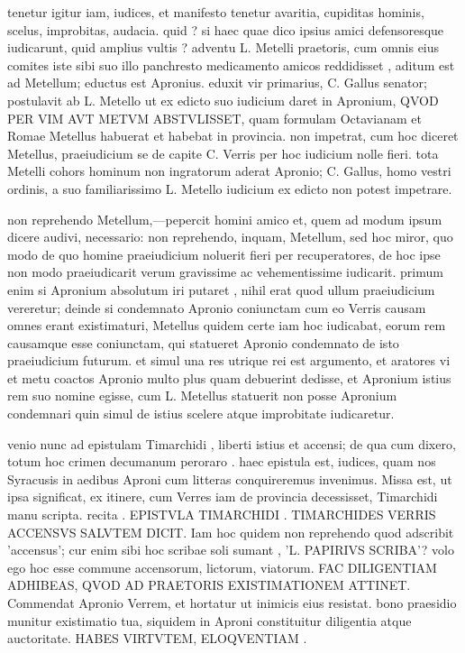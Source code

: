  tenetur igitur iam, iudices, et manifesto tenetur avaritia, cupiditas hominis, scelus, improbitas, audacia. quid ? si haec quae dico ipsius amici defensoresque iudicarunt, quid amplius vultis ? adventu L. Metelli praetoris, cum omnis eius comites iste sibi suo illo panchresto medicamento amicos reddidisset , aditum est ad Metellum; eductus est Apronius. eduxit vir primarius, C. Gallus senator; postulavit ab L. Metello ut ex edicto suo iudicium daret in Apronium, QVOD PER VIM AVT METVM ABSTVLISSET, quam formulam Octavianam et Romae Metellus habuerat et habebat in provincia. non impetrat, cum hoc diceret Metellus, praeiudicium se de capite C. Verris per hoc iudicium nolle fieri. tota Metelli cohors hominum non ingratorum aderat Apronio; C. Gallus, homo vestri ordinis, a suo familiarissimo L. Metello iudicium ex edicto non potest impetrare.

 non reprehendo Metellum,—pepercit homini amico et, quem ad modum ipsum dicere audivi, necessario: non reprehendo, inquam, Metellum, sed hoc miror, quo modo de quo homine praeiudicium noluerit fieri per recuperatores, de hoc ipse non modo praeiudicarit verum gravissime ac vehementissime iudicarit. primum enim si Apronium absolutum iri putaret , nihil erat quod ullum praeiudicium vereretur; deinde si condemnato Apronio coniunctam cum eo Verris causam omnes erant existimaturi, Metellus quidem certe iam hoc iudicabat, eorum rem causamque esse coniunctam, qui statueret Apronio condemnato de isto praeiudicium futurum. et simul una res utrique rei est argumento, et aratores vi et metu coactos Apronio multo plus quam debuerint dedisse, et Apronium istius rem suo nomine egisse, cum L. Metellus statuerit non posse Apronium condemnari quin simul de istius scelere atque improbitate iudicaretur.

 venio nunc ad epistulam Timarchidi , liberti istius et accensi; de qua cum dixero, totum hoc crimen decumanum peroraro . haec epistula est, iudices, quam nos Syracusis in aedibus Aproni cum litteras conquireremus invenimus. Missa est, ut ipsa significat, ex itinere, cum Verres iam de provincia decessisset, Timarchidi manu scripta. recita . EPISTVLA TIMARCHIDI . TIMARCHIDES VERRIS ACCENSVS SALVTEM DICIT. Iam hoc quidem non reprehendo quod adscribit 'accensus'; cur enim sibi hoc scribae soli sumant , 'L. PAPIRIVS SCRIBA'? volo ego hoc esse commune accensorum, lictorum, viatorum. FAC DILIGENTIAM ADHIBEAS, QVOD AD PRAETORIS EXISTIMATIONEM ATTINET. Commendat Apronio Verrem, et hortatur ut inimicis eius resistat. bono praesidio munitur existimatio tua, siquidem in Aproni constituitur diligentia atque auctoritate. HABES VIRTVTEM, ELOQVENTIAM .

